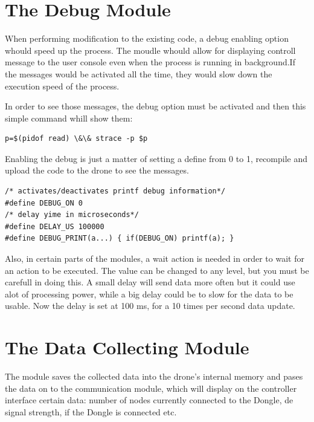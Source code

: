 \section{The Debug Module}

When performing modification to the existing code, a debug enabling option whould speed up the process. The moudle whould allow for displaying controll message to the user console even when the process is running in background.If the messages would be activated all the time, they would slow down the execution speed of the process.

In order to see those messages, the debug option must be activated and then this simple command whill show them:

\lstset{numbers=none, mathescape=true, nolol=false,caption=Simple display message command,label=lst:task}
\begin{lstlisting}
p=$(pidof read) \&\& strace -p $p
\end{lstlisting}

Enabling the debug is just a matter of setting  a define from 0 to 1, recompile and upload the code to the drone to see the messages.

\lstset{numbers=none, mathescape=true, nolol=false,caption=Data Collection use of mutex,label=lst:task}
\begin{lstlisting}
/* activates/deactivates printf debug information*/
#define DEBUG_ON 0
/* delay yime in microseconds*/
#define DELAY_US 100000
#define DEBUG_PRINT(a...) { if(DEBUG_ON) printf(a); }
\end{lstlisting}

Also, in certain parts of the modules, a wait action is needed in order to wait for an action to be executed. The value can be changed to any level, but you must be carefull in doing this. A small delay will send data more often but it could use alot of processing power, while a big delay could be to slow for the data to be usable. Now the delay is set at 100 ms, for a 10 times per second data update.



\section{The Data Collecting Module}

The module saves the collected data into the drone's internal memory and pases the data on to the communication module, which will display on the controller interface certain data: number of nodes currently connected to the Dongle, de signal strength, if the Dongle is connected etc.

